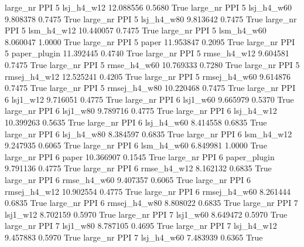  large_nr      PPI                 5   lsj_h4_w12   12.088556      0.5680    True
  large_nr      PPI                 5   lsj_h4_w60    9.808378      0.7475    True
  large_nr      PPI                 5   lsj_h4_w80    9.813642      0.7475    True
  large_nr      PPI                 5   lsm_h4_w12   10.440057      0.7475    True
  large_nr      PPI                 5   lsm_h4_w60    8.060047      1.0000    True
  large_nr      PPI                 5        paper   11.953847      0.2095    True
  large_nr      PPI                 5 paper_plugin   11.392445      0.4740    True
  large_nr      PPI                 5  rmse_h4_w12    9.604581      0.7475    True
  large_nr      PPI                 5  rmse_h4_w60   10.769333      0.7280    True
  large_nr      PPI                 5 rmsej_h4_w12   12.525241      0.4205    True
  large_nr      PPI                 5 rmsej_h4_w60    9.614876      0.7475    True
  large_nr      PPI                 5 rmsej_h4_w80   10.220468      0.7475    True
  large_nr      PPI                 6     lsj1_w12    9.716051      0.4775    True
  large_nr      PPI                 6     lsj1_w60    9.665979      0.5370    True
  large_nr      PPI                 6     lsj1_w80    9.789716      0.4775    True
  large_nr      PPI                 6   lsj_h4_w12   10.399263      0.5635    True
  large_nr      PPI                 6   lsj_h4_w60    8.414558      0.6835    True
  large_nr      PPI                 6   lsj_h4_w80    8.384597      0.6835    True
  large_nr      PPI                 6   lsm_h4_w12    9.247935      0.6065    True
  large_nr      PPI                 6   lsm_h4_w60    6.849981      1.0000    True
  large_nr      PPI                 6        paper   10.366907      0.1545    True
  large_nr      PPI                 6 paper_plugin    9.791136      0.4775    True
  large_nr      PPI                 6  rmse_h4_w12    8.162132      0.6835    True
  large_nr      PPI                 6  rmse_h4_w60    9.407357      0.6065    True
  large_nr      PPI                 6 rmsej_h4_w12   10.902554      0.4775    True
  large_nr      PPI                 6 rmsej_h4_w60    8.261444      0.6835    True
  large_nr      PPI                 6 rmsej_h4_w80    8.808022      0.6835    True
  large_nr      PPI                 7     lsj1_w12    8.702159      0.5970    True
  large_nr      PPI                 7     lsj1_w60    8.649472      0.5970    True
  large_nr      PPI                 7     lsj1_w80    8.787105      0.4695    True
  large_nr      PPI                 7   lsj_h4_w12    9.457883      0.5970    True
  large_nr      PPI                 7   lsj_h4_w60    7.483939      0.6365    True
